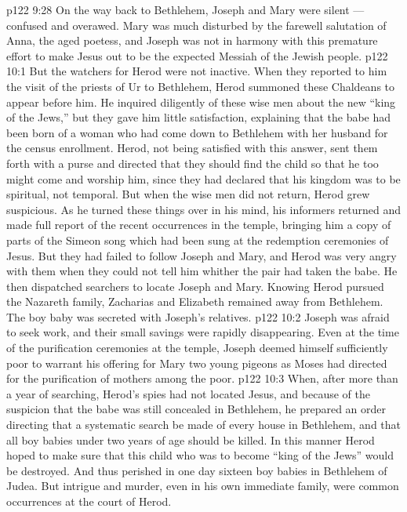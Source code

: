 \vs p122 9:28 \pc On the way back to Bethlehem, Joseph and Mary were silent --- confused and overawed. Mary was much disturbed by the farewell salutation of Anna, the aged poetess, and Joseph was not in harmony with this premature effort to make Jesus out to be the expected Messiah of the Jewish people.
\vs p122 10:1 But the watchers for Herod were not inactive. When they reported to him the visit of the priests of Ur to Bethlehem, Herod summoned these Chaldeans to appear before him. He inquired diligently of these wise men about the new “king of the Jews,” but they gave him little satisfaction, explaining that the babe had been born of a woman who had come down to Bethlehem with her husband for the census enrollment. Herod, not being satisfied with this answer, sent them forth with a purse and directed that they should find the child so that he too might come and worship him, since they had declared that his kingdom was to be spiritual, not temporal. But when the wise men did not return, Herod grew suspicious. As he turned these things over in his mind, his informers returned and made full report of the recent occurrences in the temple, bringing him a copy of parts of the Simeon song which had been sung at the redemption ceremonies of Jesus. But they had failed to follow Joseph and Mary, and Herod was very angry with them when they could not tell him whither the pair had taken the babe. He then dispatched searchers to locate Joseph and Mary. Knowing Herod pursued the Nazareth family, Zacharias and Elizabeth remained away from Bethlehem. The boy baby was secreted with Joseph’s relatives.
\vs p122 10:2 Joseph was afraid to seek work, and their small savings were rapidly disappearing. Even at the time of the purification ceremonies at the temple, Joseph deemed himself sufficiently poor to warrant his offering for Mary two young pigeons as Moses had directed for the purification of mothers among the poor.
\vs p122 10:3 When, after more than a year of searching, Herod’s spies had not located Jesus, and because of the suspicion that the babe was still concealed in Bethlehem, he prepared an order directing that a systematic search be made of every house in Bethlehem, and that all boy babies under two years of age should be killed. In this manner Herod hoped to make sure that this child who was to become “king of the Jews” would be destroyed. And thus perished in one day sixteen boy babies in Bethlehem of Judea. But intrigue and murder, even in his own immediate family, were common occurrences at the court of Herod.
